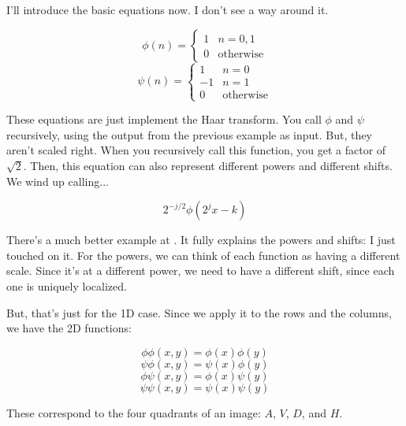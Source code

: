 \documentclass[leqno]{article}
\begin{document}
            I'll introduce the basic equations now. I don't see a way around it.

            \begin{equation}
                \phi(n) = 
                \begin{cases}
                    1 & n=0,1 \\
                    0 & \mathrm{otherwise}
                \end{cases}
                \label{eq:phi}
            \end{equation}
            \begin{equation}
                \psi(n) = 
                \begin{cases}
                    1 & n=0 \\
                    -1 & n=1 \\
                    0 & \mathrm{otherwise}
                \end{cases}
                \label{eq:phi}
            \end{equation}

            These equations are just implement the Haar transform. You call $\phi$ and $\psi$ recursively, using the output from the previous example as input. But, they aren't scaled right. When you recursively call this function, you get a factor of $\sqrt{2}$. Then, this equation can also represent different powers and different shifts. We wind up calling...


            $$2^{-j/2}\phi(2^j x - k)$$
            
            There's a much better example at \cite{stollnitz1995wavelets}. It fully explains the powers and shifts: I just touched on it. For the powers, we can think of each function as having a different scale. Since it's at a different power, we need to have a different shift, since each one is uniquely localized. 

            But, that's just for the 1D case. Since we apply it to the rows and the columns, we have the 2D functions:

            $$ \phi\phi(x,y) = \phi(x) \phi(y) $$
            $$ \psi\phi(x,y) = \psi(x) \phi(y) $$
            $$ \phi\psi(x,y) = \phi(x) \psi(y) $$
            $$ \psi\psi(x,y) = \psi(x) \psi(y) $$

            These correspond to the four quadrants of an image: $A$, $V$, $D$, and $H$.

\end{document}
